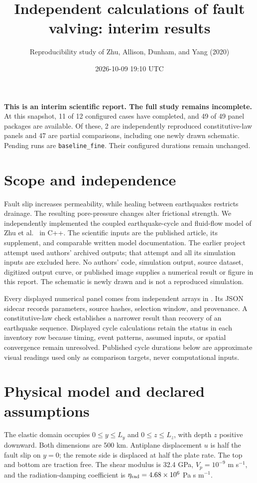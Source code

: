 \documentclass[11pt]{article}
\title{Independent calculations of fault valving: interim results}
\author{Reproducibility study of Zhu, Allison, Dunham, and Yang (2020)}
\date{2026-10-09 19:10 UTC}
\newcommand{\code}[1]{\texttt{\detokenize{#1}}}
\begin{document}
\maketitle
\textbf{This is an interim scientific report. The full study remains incomplete.}
At this snapshot, 11 of 12 configured cases have completed, and 49 of 49 panel packages are available. Of these, 2 are independently reproduced constitutive-law panels and 47 are partial comparisons, including one newly drawn schematic. Pending runs are \texttt{baseline\_fine}. Their configured durations remain unchanged.

\section{Scope and independence}
Fault slip increases permeability, while healing between earthquakes restricts
drainage. The resulting pore-pressure changes alter frictional strength. We
independently implemented the coupled earthquake-cycle and fluid-flow model of
Zhu et al.~\cite{zhu} in C++. The scientific inputs are the published article,
its supplement, and comparable written model documentation. The earlier project
attempt used authors' archived outputs; that attempt and all its simulation
inputs are excluded here. No authors' code, simulation output, source dataset,
digitized output curve, or published image supplies a numerical result or figure
in this report. The schematic is newly drawn and is not a reproduced simulation.

Every displayed numerical panel comes from independent arrays in
\code{data/panels}. Its JSON sidecar records parameters, source hashes, selection
window, and provenance. A constitutive-law check establishes a narrower result
than recovery of an earthquake sequence. Displayed cycle calculations retain
the status in each inventory row because timing, event patterns, assumed inputs,
or spatial convergence remain unresolved. Published cycle durations below are approximate
visual readings used only as comparison targets, never computational inputs.
\section{Physical model and declared assumptions}
The elastic domain occupies $0\leq y\leq L_y$ and $0\leq z\leq L_z$, with depth
$z$ positive downward. Both dimensions are 500 km. Antiplane displacement $u$
is half the fault slip on $y=0$; the remote side is displaced at half the plate
rate. The top and bottom are traction free. The shear modulus is 32.4 GPa,
$V_p=10^{-9}$ m s$^{-1}$, and the radiation-damping coefficient is
$\eta_{\rm rad}=4.68\times10^6$ Pa s m$^{-1}$.
\end{document}
